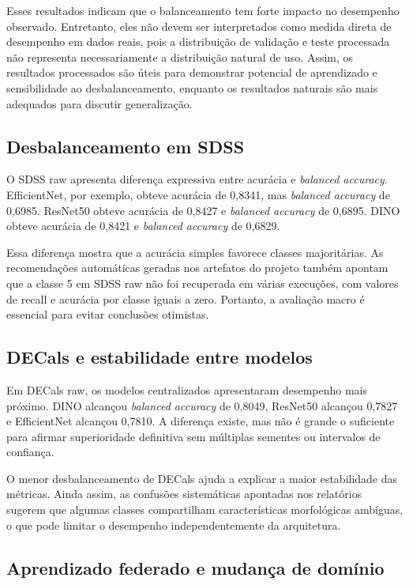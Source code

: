 \documentclass[conference]{IEEEtran}
\begin{document}
Esses resultados indicam que o balanceamento tem forte impacto no desempenho observado. Entretanto, eles não devem ser interpretados como medida direta de desempenho em dados reais, pois a distribuição de validação e teste processada não representa necessariamente a distribuição natural de uso. Assim, os resultados processados são úteis para demonstrar potencial de aprendizado e sensibilidade ao desbalanceamento, enquanto os resultados naturais são mais adequados para discutir generalização.

\subsection{Desbalanceamento em SDSS}

O SDSS raw apresenta diferença expressiva entre acurácia e \textit{balanced accuracy}. EfficientNet, por exemplo, obteve acurácia de 0,8341, mas \textit{balanced accuracy} de 0,6985. ResNet50 obteve acurácia de 0,8427 e \textit{balanced accuracy} de 0,6895. DINO obteve acurácia de 0,8421 e \textit{balanced accuracy} de 0,6829.

Essa diferença mostra que a acurácia simples favorece classes majoritárias. As recomendações automáticas geradas nos artefatos do projeto também apontam que a classe 5 em SDSS raw não foi recuperada em várias execuções, com valores de recall e acurácia por classe iguais a zero. Portanto, a avaliação macro é essencial para evitar conclusões otimistas.

\subsection{DECals e estabilidade entre modelos}

Em DECals raw, os modelos centralizados apresentaram desempenho mais próximo. DINO alcançou \textit{balanced accuracy} de 0,8049, ResNet50 alcançou 0,7827 e EfficientNet alcançou 0,7810. A diferença existe, mas não é grande o suficiente para afirmar superioridade definitiva sem múltiplas sementes ou intervalos de confiança.

O menor desbalanceamento de DECals ajuda a explicar a maior estabilidade das métricas. Ainda assim, as confusões sistemáticas apontadas nos relatórios sugerem que algumas classes compartilham características morfológicas ambíguas, o que pode limitar o desempenho independentemente da arquitetura.

\subsection{Aprendizado federado e mudança de domínio}
\end{document}
